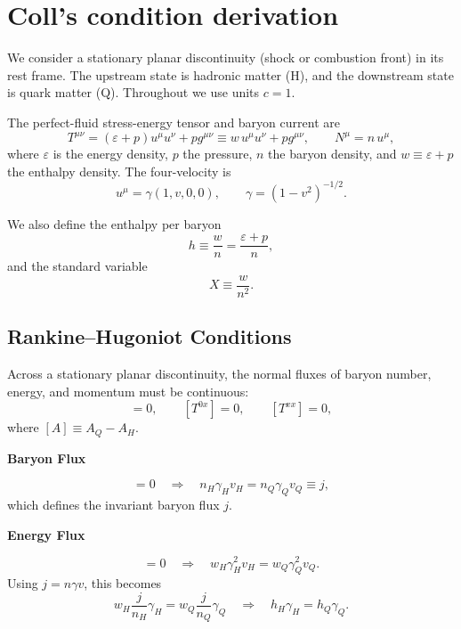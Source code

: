 \documentclass[superscriptaddress,amsmath,floatfix,aps,prc,twocolumn]{revtex4-1}
\begin{document}
\section{Coll's condition derivation}

We consider a stationary planar discontinuity (shock or combustion front) in its rest frame.
The upstream state is hadronic matter (H), and the downstream state is quark matter (Q).
Throughout we use units $c=1$.

The perfect-fluid stress-energy tensor and baryon current are
\begin{equation}
T^{\mu\nu} = (\varepsilon + p) u^\mu u^\nu + p g^{\mu\nu}
\equiv w\, u^\mu u^\nu + p g^{\mu\nu},
\qquad
N^\mu = n\, u^\mu ,
\end{equation}
where $\varepsilon$ is the energy density, $p$ the pressure, $n$ the baryon density,
and $w \equiv \varepsilon + p$ the enthalpy density.
The four-velocity is
\begin{equation}
u^\mu = \gamma (1, v, 0, 0), \qquad \gamma = (1-v^2)^{-1/2}.
\end{equation}

We also define the enthalpy per baryon
\begin{equation}
h \equiv \frac{w}{n} = \frac{\varepsilon + p}{n},
\end{equation}
and the standard variable
\begin{equation}
X \equiv \frac{w}{n^2}.
\end{equation}

\subsection*{Rankine--Hugoniot Conditions}

Across a stationary planar discontinuity, the normal fluxes of baryon number, energy,
and momentum must be continuous:
\begin{equation}
[N^x]=0, \qquad [T^{0x}]=0, \qquad [T^{xx}]=0,
\end{equation}
where $[A]\equiv A_Q-A_H$.

\textbf{Baryon Flux}

\begin{equation}
[N^x]=0
\quad \Rightarrow \quad
n_H \gamma_H v_H = n_Q \gamma_Q v_Q \equiv j ,
\end{equation}
which defines the invariant baryon flux $j$.

\textbf{Energy Flux}

\begin{equation}
[T^{0x}]=0
\quad \Rightarrow \quad
w_H \gamma_H^2 v_H = w_Q \gamma_Q^2 v_Q .
\end{equation}
Using $j = n \gamma v$, this becomes
\begin{equation}
w_H \frac{j}{n_H} \gamma_H = w_Q \frac{j}{n_Q} \gamma_Q
\quad \Rightarrow \quad
h_H \gamma_H = h_Q \gamma_Q .
\label{eq:hgamma}
\end{equation}
\end{document}
